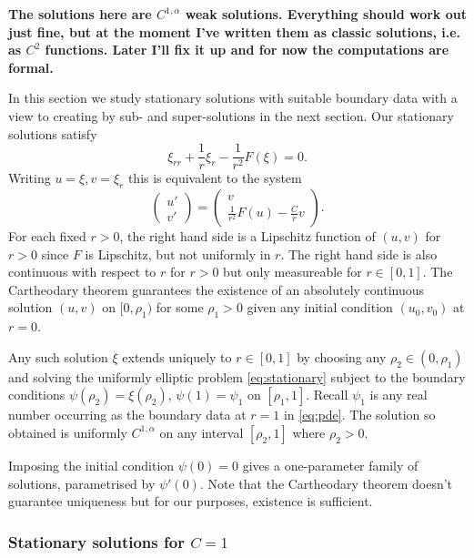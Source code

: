\documentclass{amsart}
\begin{document}
\textbf{The solutions here are \(C^{1,\alpha}\) weak solutions. Everything should work out just fine, but at the moment I've written them as classic solutions, i.e. as \(C^2\) functions. Later I'll fix it up and for now the computations are formal.}

In this section we study stationary solutions with suitable boundary data with a view to creating by sub- and super-solutions in the next section. Our stationary solutions satisfy
\begin{equation}
\label{eq:stationary}
\xi_{rr} + \frac{1}{r} \xi_r - \frac{1}{r^2} F(\xi)  = 0.
\end{equation}
Writing \(u = \xi, v = \xi_r\) this is equivalent to the system
\[
\begin{pmatrix}
u' \\
v'
\end{pmatrix}
=
\begin{pmatrix}
v \\
\frac{1}{r^2} F(u) - \frac{C}{r} v
\end{pmatrix}.
\]
For each fixed \(r > 0\), the right hand side is a Lipschitz function of \((u,v)\) for \(r>0\) since \(F\) is Lipschitz, but not uniformly in \(r\). The right hand side is also continuous with respect to \(r\) for \(r > 0\) but only measureable for \(r \in [0, 1]\). The Cartheodary theorem guarantees the existence of an absolutely continuous solution \((u, v)\) on \([0, \rho_1)\) for some  \(\rho_1 > 0\) given any initial condition \((u_0, v_0)\) at \(r=0\).

Any such solution \(\xi\) extends uniquely to \(r \in [0, 1]\) by choosing any \(\rho_2 \in (0, \rho_1)\) and solving the uniformly elliptic problem \eqref{eq:stationary} subject to the boundary conditions \(\psi(\rho_2) = \xi(\rho_2)\), \(\psi(1) = \psi_1\) on \([\rho_1, 1]\). Recall \(\psi_1\) is any real number occurring as the boundary data at \(r=1\) in \eqref{eq:pde}. The solution so obtained is uniformly \(C^{1,\alpha}\) on any interval \([\rho_2, 1]\) where \(\rho_2 > 0\).

Imposing the initial condition \(\psi(0) = 0\) gives a one-parameter family of solutions, parametrised by \(\psi'(0)\). Note that the Cartheodary theorem doesn't guarantee uniqueness but for our purposes, existence is sufficient.

\subsubsection*{Stationary solutions for \(C=1\)}
\end{document}
